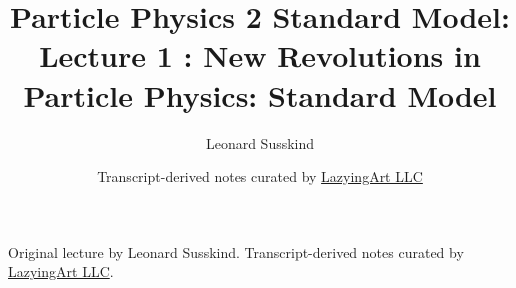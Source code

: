 \documentclass[11pt,oneside]{book}
\begin{document}
\frontmatter
\title{Particle Physics 2 Standard Model: Lecture 1 : New Revolutions in Particle Physics: Standard Model}
\author{Leonard Susskind}
\date{Transcript-derived notes curated by \href{https://lazying.art}{LazyingArt LLC}}
\maketitle
\begin{center}
\small Original lecture by Leonard Susskind. Transcript-derived notes curated by \href{https://lazying.art}{LazyingArt LLC}.
\end{center}
\clearpage
\mainmatter

\end{document}
